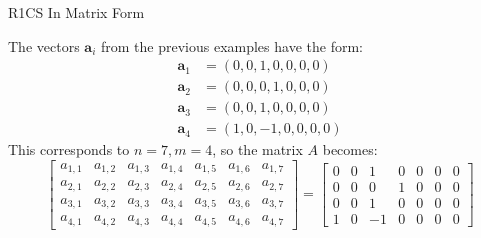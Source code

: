 \documentclass{zkdl-presentation-template}
\begin{document}
    \begin{frame}{R1CS In Matrix Form}
        \begin{example}
            The vectors $\boldsymbol{a}_i$ from the previous examples have the form:
            {\begin{align*}
                \boldsymbol{a}_1 &= (0, 0, 1, 0, 0, 0, 0) \\
                \boldsymbol{a}_2 &= (0, 0, 0, 1, 0, 0, 0) \\
                \boldsymbol{a}_3 &= (0, 0, 1, 0, 0, 0, 0) \\
                \boldsymbol{a}_4 &= (1, 0, -1, 0, 0, 0, 0)
            \end{align*}}
            This corresponds to $n = 7, m = 4$, so the matrix $A$ becomes:
            {\footnotesize \begin{equation*}
                \begin{bmatrix}
                    a_{1,1} & a_{1,2} & a_{1,3} & a_{1,4} & a_{1,5} & a_{1,6} & a_{1,7} \\
                    a_{2,1} & a_{2,2} & a_{2,3} & a_{2,4} & a_{2,5} & a_{2,6} & a_{2,7} \\
                    a_{3,1} & a_{3,2} & a_{3,3} & a_{3,4} & a_{3,5} & a_{3,6} & a_{3,7} \\
                    a_{4,1} & a_{4,2} & a_{4,3} & a_{4,4} & a_{4,5} & a_{4,6} & a_{4,7}
                \end{bmatrix} = \begin{bmatrix}
                    0 & 0 & 1 & 0 & 0 & 0 & 0 \\
                    0 & 0 & 0 & 1 & 0 & 0 & 0 \\
                    0 & 0 & 1 & 0 & 0 & 0 & 0 \\
                    1 & 0 & -1 & 0 & 0 & 0 & 0 
                \end{bmatrix}
            \end{equation*}}
        \end{example}
    \end{frame}
\end{document}
